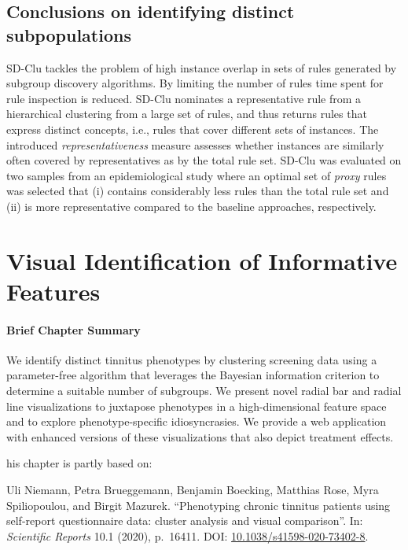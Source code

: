 \documentclass[
  oneside]{book}
\newenvironment{infobox}[1]
  {
  \begin{chapter-summary}
  }
  {
  \end{chapter-summary}
  }
\begin{document}
\hypertarget{sdclu-conclusions}{%
\section{Conclusions on identifying distinct subpopulations}\label{sdclu-conclusions}}

SD-Clu tackles the problem of high instance overlap in sets of rules generated by subgroup discovery algorithms.
By limiting the number of rules time spent for rule inspection is reduced.
SD-Clu nominates a representative rule from a hierarchical clustering from a large set of rules, and thus returns rules that express distinct concepts, i.e., rules that cover different sets of instances.
The introduced \emph{representativeness} measure assesses whether instances are similarly often covered by representatives as by the total rule set.
SD-Clu was evaluated on two samples from an epidemiological study where an optimal set of \emph{proxy} rules was selected that (i) contains considerably less rules than the total rule set and (ii) is more representative compared to the baseline approaches, respectively.

\hypertarget{phenotypes}{%
\chapter{Visual Identification of Informative Features}\label{phenotypes}}

\begin{infobox}{tasks.pdf}

\hypertarget{brief-chapter-summary-2}{%
\subsubsection*{Brief Chapter Summary}\label{brief-chapter-summary-2}}

We identify distinct tinnitus phenotypes by clustering screening data using a parameter-free algorithm that leverages the Bayesian information criterion to determine a suitable number of subgroups.
We present novel radial bar and radial line visualizations to juxtapose phenotypes in a high-dimensional feature space and to explore phenotype-specific idiosyncrasies.
We provide a web application with enhanced versions of these visualizations that also depict treatment effects.

\end{infobox}

\begin{infobox}

This chapter is partly based on:

Uli Niemann, Petra Brueggemann, Benjamin Boecking, Matthias Rose, Myra Spiliopoulou, and Birgit Mazurek. ``Phenotyping chronic tinnitus patients using self-report questionnaire data: cluster analysis and visual comparison''. In: \emph{Scientific Reports} 10.1 (2020), p.~16411. DOI: \href{https://doi.org/10.1038\%2Fs41598-020-73402-8}{10.1038/s41598-020-73402-8}.

\end{infobox}
\end{document}
